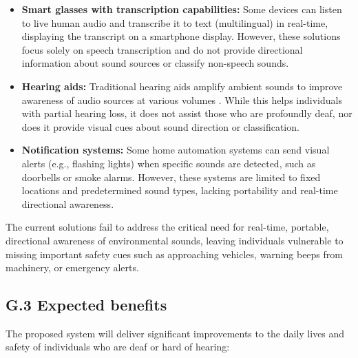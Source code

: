 \documentclass[12pt]{article}
\theoremstyle{definition}
\begin{document}
\begin{itemize}
\item \textbf{Smart glasses with transcription capabilities:} Some devices can
listen to live human audio and transcribe it to text (multilingual) in
real-time, displaying the transcript on a smartphone display. However, these
solutions focus solely on speech transcription and do not provide directional
information about sound sources or classify non-speech sounds.

\item \textbf{Hearing aids:} Traditional hearing aids amplify ambient sounds to
improve awareness of audio sources at various volumes \cite{NIDCD2022}. While
this helps individuals with partial hearing loss, it does not assist those who
are profoundly deaf, nor does it provide visual cues about sound direction or
classification.

\item \textbf{Notification systems:} Some home automation systems can send
visual alerts (e.g., flashing lights) when specific sounds are detected, such as
doorbells or smoke alarms. However, these systems are limited to fixed locations
and predetermined sound types, lacking portability and real-time directional
awareness.
\end{itemize}

The current solutions fail to address the critical need for real-time, portable,
directional awareness of environmental sounds, leaving individuals vulnerable to
missing important safety cues such as approaching vehicles, warning beeps from
machinery, or emergency alerts.

\subsection{G.3 Expected benefits}

The proposed system will deliver significant improvements to the daily lives and
safety of individuals who are deaf or hard of hearing:
\end{document}
